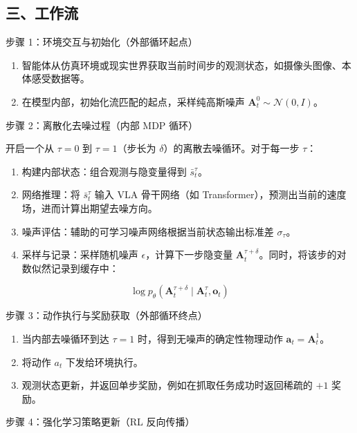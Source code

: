 \hypertarget{ux4e09ux5de5ux4f5cux6d41-1}{%
\subsection{三、工作流}\label{ux4e09ux5de5ux4f5cux6d41-1}}

步骤 1：环境交互与初始化（外部循环起点）

\begin{enumerate}
\def\labelenumi{\arabic{enumi}.}
\tightlist
\item
  智能体从仿真环境或现实世界获取当前时间步的观测状态，如摄像头图像、本体感受数据等。
\item
  在模型内部，初始化流匹配的起点，采样纯高斯噪声 \(\mathbf{A}_t^0\sim\mathcal{N}(0,I)\)。
\end{enumerate}

步骤 2：离散化去噪过程（内部 MDP 循环）

开启一个从 \(\tau=0\) 到 \(\tau=1\)（步长为 \(\delta\)）的离散去噪循环。对于每一步 \(\tau\)：

\begin{enumerate}
\def\labelenumi{\arabic{enumi}.}
\tightlist
\item
  构建内部状态：组合观测与隐变量得到 \(\bar{s}_t^\tau\)。
\item
  网络推理：将 \(\bar{s}_t^\tau\) 输入 VLA 骨干网络（如 Transformer），预测出当前的速度场，进而计算出期望去噪方向。
\item
  噪声评估：辅助的可学习噪声网络根据当前状态输出标准差 \(\sigma_\tau\)。
\item
  采样与记录：采样随机噪声 \(\epsilon\)，计算下一步隐变量 \(\mathbf{A}_t^{\tau+\delta}\)。同时，将该步的对数似然记录到缓存中：
\end{enumerate}

\[
\log p_\theta\left(\mathbf{A}_t^{\tau+\delta}\mid \mathbf{A}_t^\tau,\mathbf{o}_t\right)
\]

步骤 3：动作执行与奖励获取（外部循环终点）

\begin{enumerate}
\def\labelenumi{\arabic{enumi}.}
\tightlist
\item
  当内部去噪循环到达 \(\tau=1\) 时，得到无噪声的确定性物理动作 \(\mathbf{a}_t=\mathbf{A}_t^1\)。
\item
  将动作 \(a_t\) 下发给环境执行。
\item
  观测状态更新，并返回单步奖励，例如在抓取任务成功时返回稀疏的 \(+1\) 奖励。
\end{enumerate}

步骤 4：强化学习策略更新（RL 反向传播）

